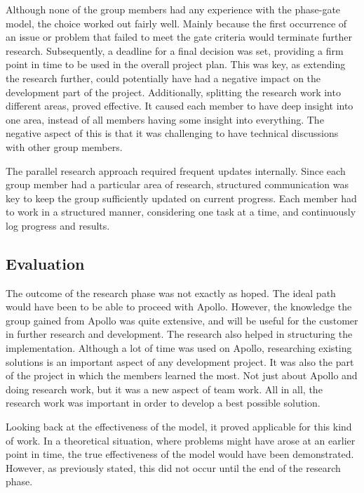 Although none of the group members had any experience with the phase-gate model, the choice worked out fairly well. Mainly because the first occurrence of an issue or problem that failed to meet the gate criteria would terminate further research. Subsequently, a deadline for a final decision was set, providing a firm point in time to be used in the overall project plan. This was key, as extending the research further, could potentially have had a negative impact on the development part of the project. Additionally, splitting the research work into different areas, proved effective. It caused each member to have deep insight into one area, instead of all members having some insight into everything. The negative aspect of this is that it was challenging to have technical discussions with other group members.

The parallel research approach required frequent updates internally. Since each group member had a particular area of research, structured communication was key to keep the group sufficiently updated on current progress. Each member had to work in a structured manner, considering one task at a time, and continuously log progress and results.

\subsection{Evaluation}
\label{subsec:project_evaluation-research_phase-evaluation}

The outcome of the research phase was not exactly as hoped. The ideal path would have been to be able to proceed with Apollo. However, the knowledge the group gained from Apollo was quite extensive, and will be useful for the customer in further research and development. The research also helped in structuring the implementation. Although a lot of time was used on Apollo, researching existing solutions is an important aspect of any development project. It was also the part of the project in which the members learned the most. Not just about Apollo and doing research work, but it was a new aspect of team work. All in all, the research work was important in order to develop a best possible solution.

Looking back at the effectiveness of the model, it proved applicable for this kind of work. In a theoretical situation, where problems might have arose at an earlier point in time, the true effectiveness of the model would have been demonstrated. However, as previously stated, this did not occur until the end of the research phase.


